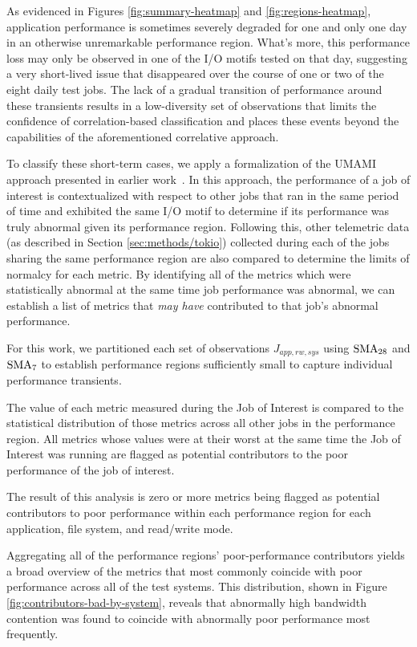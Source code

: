 As evidenced in Figures \ref{fig:summary-heatmap} and \ref{fig:regions-heatmap}, application performance is sometimes severely degraded for one and only one day in an otherwise unremarkable performance region.
What's more, this performance loss may only be observed in one of the I/O motifs tested on that day, suggesting a very short-lived issue that disappeared over the course of one or two of the eight daily test jobs.
The lack of a gradual transition of performance around these transients results in a low-diversity set of observations that limits the confidence of correlation-based classification and places these events beyond the capabilities of the aforementioned correlative approach.

To classify these short-term cases, we apply a formalization of the UMAMI approach presented in earlier work~\cite{Lockwood2017}.
In this approach, the performance of a job of interest is contextualized with respect to other jobs that ran in the same period of time and exhibited the same I/O motif to determine if its performance was truly abnormal given its performance region.
Following this, other telemetric data (as described in Section \ref{sec:methods/tokio}) collected during each of the jobs sharing the same performance region are also compared to determine the limits of normalcy for each metric.
By identifying all of the metrics which were statistically abnormal at the same time job performance was abnormal, we can establish a list of metrics that \emph{may have} contributed to that job's abnormal performance.

For this work, we partitioned each set of observations $J_{app, rw, sys}$ using $\textup{SMA}_{28}$ and $\textup{SMA}_{7}$ to establish performance regions sufficiently small to capture individual performance transients.


The value of each metric measured during the Job of Interest is compared to the statistical distribution of those metrics across all other jobs in the performance region.  All metrics whose values were at their worst at the same time the Job of Interest was running are flagged as potential contributors to the poor performance of the job of interest.

The result of this analysis is zero or more metrics being flagged as potential contributors to poor performance within each performance region for each application, file system, and read/write mode.

Aggregating all of the performance regions' poor-performance contributors yields a broad overview of the metrics that most commonly coincide with poor performance across all of the test systems.
This distribution, shown in Figure \ref{fig:contributors-bad-by-system}, reveals that abnormally high bandwidth contention was found to coincide with abnormally poor performance most frequently.


